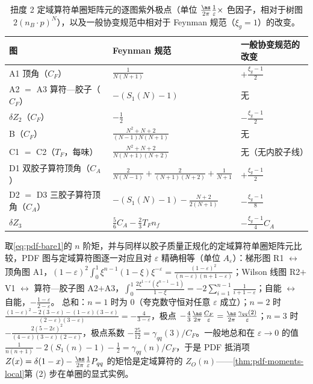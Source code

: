 \begin{table}[htbp]
\centering
\caption{扭度 2 定域算符单圈矩阵元的逐图紫外极点（单位 $\frac{\as}{2\pi}\frac1\varepsilon\times$ 色因子，相对于树图 $2(n_B\cdot p)^N$），以及一般协变规范中相对于 Feynman 规范（$\xi_g=1$）的改变。}\label{tab:pdf-localgraphs}
\small
\renewcommand{\arraystretch}{1.2}
\begin{tabular}{@{}lll@{}}
\toprule
图 & Feynman 规范 & 一般协变规范的改变\\
\midrule
A1 顶角（$C_F$） & $\frac{1}{N(N+1)}$ & $+\frac{\xi_g-1}{2}$\\
A2 $=$ A3 算符—胶子（$C_F$） & $-(S_1(N)-1)$ & 无\\
$\delta Z_2$（$C_F$） & $-\frac12$ & $-\frac{\xi_g-1}{2}$\\
B（$C_F$） & $\frac{N^2+N+2}{(N-1)N(N+1)}$ & 无\\
C1 $=$ C2（$T_F$，每味） & $\frac{N^2+N+2}{N(N+1)(N+2)}$ & 无（无内胶子线）\\
D1 双胶子算符顶角（$C_A$） & $\frac{2}{N(N-1)}+\frac{2}{(N+1)(N+2)}+\frac{1}{N+1}$ & $+\frac{\xi_g-1}{2}$\\
D2 $=$ D3 三胶子算符顶角（$C_A$） & $-(S_1(N)-1)-\frac{N+2}{2(N+1)}$ & $-\frac{\xi_g-1}{8}$\\
$\delta Z_3$ & $\frac56C_A-\frac23T_Fn_f$ & $-\frac{\xi_g-1}{4}C_A$\\
\bottomrule
\end{tabular}
\end{table}

\begin{example}\label{ex:pdf-moments-exact}
取\cref{eq:pdf-bare1}的 $n$ 阶矩，并与同样以胶子质量正规化的定域算符单圈矩阵元比较，PDF 图与定域算符图逐一对应且对 $\varepsilon$ 精确相等（单位 $A_\varepsilon$）：梯形图 R1 $\leftrightarrow$ 顶角图 A1，$(1-\varepsilon)^2\int_0^1\xi^{n-1}(1-\xi)\xi^{-\varepsilon}=\frac{(1-\varepsilon)^2}{(n-\varepsilon)(n+1-\varepsilon)}$；Wilson 线图 R2$+$V1 $\leftrightarrow$ 算符—胶子图 A2$+$A3，$\int_0^1\frac{2\xi^{1-\varepsilon}(\xi^{n-1}-1)}{1-\xi}=-2\sum_{i=1}^{n-1}\frac{1}{i+1-\varepsilon}$；自能 $\leftrightarrow$ 自能，$-\frac{1-\varepsilon}{2-\varepsilon}$。
总和：$n=1$ 时为 $0$（夸克数守恒对任意 $\varepsilon$ 成立）；$n=2$ 时 $\frac{(1-\varepsilon)^2-2(3-\varepsilon)-(1-\varepsilon)(3-\varepsilon)}{(2-\varepsilon)(3-\varepsilon)}=-\frac{4}{3-\varepsilon}$，极点 $-\frac43\frac{\as}{2\pi}\frac{C_F}\varepsilon=\frac{\as}{2\pi}\frac{\gamma_{qq}(2)}\varepsilon$；$n=3$ 时 $-\frac{2(5-2\varepsilon)^2}{(4-\varepsilon)(3-\varepsilon)(2-\varepsilon)}$，极点系数 $-\frac{25}{12}=\gamma_{qq}(3)/C_F$。一般地总和在 $\varepsilon\to0$ 的值 $\frac{1}{n(n+1)}-2(S_1(n)-1)-\frac12=\gamma_{qq}(n)/C_F$，于是 PDF 抵消项 $Z(x)=\delta(1-x)-\frac{\as}{2\pi}\frac1\varepsilon P_{qq}$ 的矩恰是定域算符的 $Z_O(n)$——\cref{thm:pdf-moments-local}第 (2) 步在单圈的显式实例。
\end{example}

